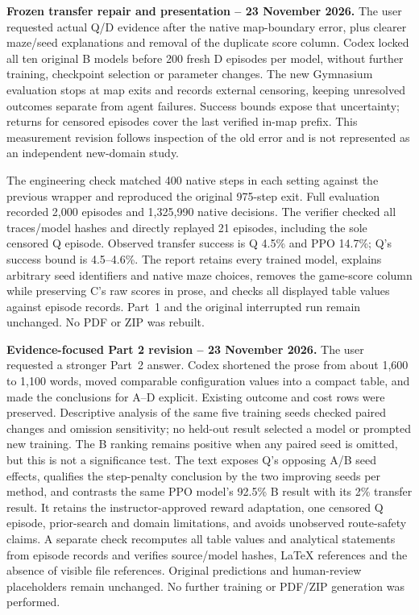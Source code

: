 \medskip
\noindent\textbf{Frozen transfer repair and presentation -- 23 November 2026.}
The user requested actual Q/D evidence after the native map-boundary error,
plus clearer maze/seed explanations and removal of the duplicate score column.
Codex locked all ten original B models before 200 fresh D episodes per model,
without further training, checkpoint selection or parameter changes. The new
Gymnasium evaluation stops at map exits and records external censoring,
keeping unresolved outcomes separate from agent failures. Success bounds
expose that uncertainty; returns for censored episodes cover the last verified
in-map prefix. This measurement revision follows inspection of the old error
and is not represented as an independent new-domain study.

The engineering check matched 400 native steps in each setting against the
previous wrapper and reproduced the original 975-step exit. Full evaluation
recorded 2,000 episodes and 1,325,990 native decisions. The verifier checked
all traces/model hashes and directly replayed 21 episodes, including the sole
censored Q episode. Observed transfer success is Q 4.5\% and PPO 14.7\%;
Q's success bound is 4.5--4.6\%. The report retains every trained model,
explains arbitrary seed identifiers and native maze choices, removes the
game-score column while preserving C's raw scores in prose, and checks
all displayed table values against episode records. Part~1 and the original
interrupted run remain unchanged. No PDF or ZIP was rebuilt.

\medskip
\noindent\textbf{Evidence-focused Part 2 revision -- 23 November 2026.}
The user requested a stronger Part~2 answer. Codex shortened the prose from
about 1,600 to 1,100 words, moved comparable configuration values into a
compact table, and made the conclusions for A--D explicit. Existing outcome
and cost rows were preserved. Descriptive analysis of the same five training
seeds checked paired changes and omission sensitivity; no held-out result
selected a model or prompted new training. The B ranking remains positive
when any paired seed is omitted, but this is not a significance test.
The text exposes Q's opposing A/B seed effects, qualifies the step-penalty
conclusion by the two improving seeds per method, and contrasts the same
PPO model's 92.5\% B result with its 2\% transfer result. It retains the
instructor-approved reward adaptation, one censored Q episode, prior-search
and domain limitations, and avoids unobserved route-safety claims. A separate
check recomputes all table values and analytical statements from episode
records and verifies source/model hashes, LaTeX references and the absence of
visible file references. Original predictions and human-review placeholders
remain unchanged. No further training or PDF/ZIP generation was performed.

